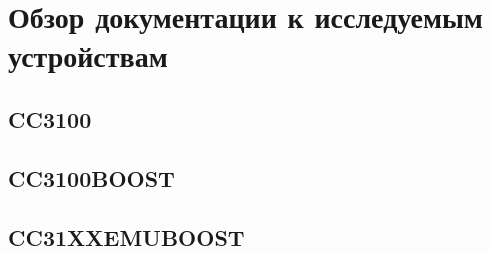 \chapter{Обзор документации к исследуемым устройствам}
\label{cha:analysis}
%
%

\section{CC3100}

\section{CC3100BOOST}

\section{CC31XXEMUBOOST}



